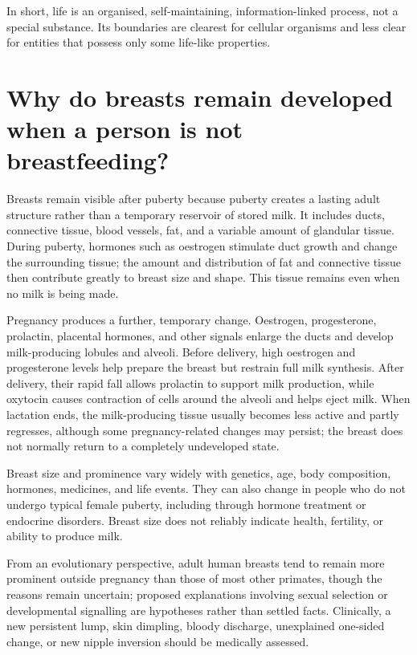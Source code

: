 \documentclass[11pt,oneside]{report}
\begin{document}
In short, life is an organised, self-maintaining, information-linked process,
not a special substance. Its boundaries are clearest for cellular organisms
and less clear for entities that possess only some life-like properties.

\section{Why do breasts remain developed when a person is not breastfeeding?}

Breasts remain visible after puberty because puberty creates a lasting adult
structure rather than a temporary reservoir of stored milk. It includes ducts,
connective tissue, blood vessels, fat, and a variable amount of glandular
tissue. During puberty, hormones such as oestrogen stimulate duct growth and
change the surrounding tissue; the amount and distribution of fat and
connective tissue then contribute greatly to breast size and shape. This tissue
remains even when no milk is being made.

Pregnancy produces a further, temporary change. Oestrogen, progesterone,
prolactin, placental hormones, and other signals enlarge the ducts and develop
milk-producing lobules and alveoli. Before delivery, high oestrogen and
progesterone levels help prepare the breast but restrain full milk synthesis.
After delivery, their rapid fall allows prolactin to support milk production,
while oxytocin causes contraction of cells around the alveoli and helps eject
milk. When lactation ends, the milk-producing tissue usually becomes less active
and partly regresses, although some pregnancy-related changes may persist; the
breast does not normally return to a completely undeveloped state.

Breast size and prominence vary widely with genetics, age, body composition,
hormones, medicines, and life events. They can also change in people who do not
undergo typical female puberty, including through hormone treatment or
endocrine disorders. Breast size does not reliably indicate health, fertility,
or ability to produce milk.

From an evolutionary perspective, adult human breasts tend to remain more
prominent outside pregnancy than those of most other primates, though the
reasons remain uncertain; proposed explanations involving sexual selection or
developmental signalling are hypotheses rather than settled facts. Clinically,
a new persistent lump, skin dimpling, bloody discharge, unexplained one-sided
change, or new nipple inversion should be medically assessed.
\end{document}
